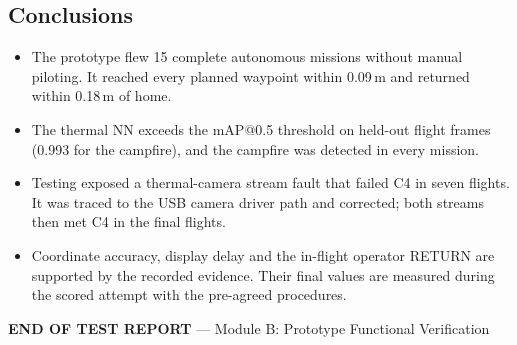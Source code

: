 \documentclass[10pt,a4paper]{article}
\begin{document}
\subsection{Conclusions}
\begin{itemize}
  \item The prototype flew 15 complete autonomous missions without manual piloting. It reached every planned waypoint
        within 0.09\,m and returned within 0.18\,m of home.
  \item The thermal NN exceeds the mAP@0.5 threshold on held-out flight frames (0.993 for the campfire), and the campfire
        was detected in every mission.
  \item Testing exposed a thermal-camera stream fault that failed C4 in seven flights. It was traced to the USB camera
        driver path and corrected; both streams then met C4 in the final flights.
  \item Coordinate accuracy, display delay and the in-flight operator RETURN are supported by the recorded evidence. Their
        final values are measured during the scored attempt with the pre-agreed procedures.
\end{itemize}

\begin{center}\textbf{END OF TEST REPORT} --- Module B: Prototype Functional Verification\end{center}
\end{document}
